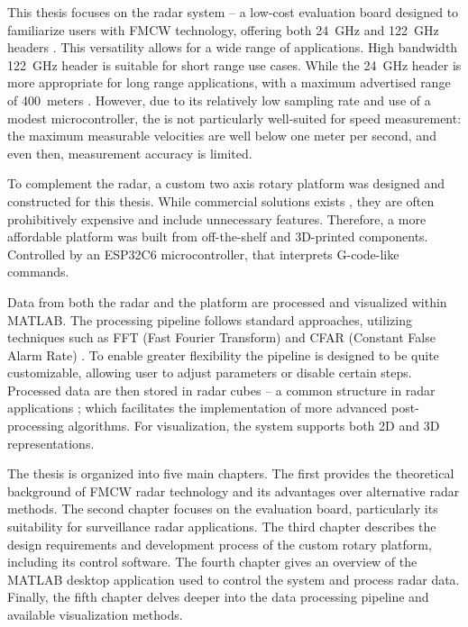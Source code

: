 This thesis focuses on the \sirad radar system -- a low-cost evaluation board designed to familiarize users with FMCW technology, offering both 24~GHz and 122~GHz headers \cite{siradMAN}.
This versatility allows for a wide range of applications.
High bandwidth 122~GHz header is suitable for short range use cases.
While the 24~GHz header is more appropriate for long range applications, with a maximum advertised range of 400~meters \cite{siradMANOld}.
However, due to its relatively low sampling rate and use of a modest microcontroller, the \sirad is not particularly well-suited for speed measurement: the maximum measurable velocities are well below one meter per second, and even then, measurement accuracy is limited.

To complement the radar, a custom two axis rotary platform was designed and constructed for this thesis.
While commercial solutions exists \cite{standa, carl}, they are often prohibitively expensive and include unnecessary features.
Therefore, a more affordable platform was built from off-the-shelf and 3D-printed components.
Controlled by an ESP32C6 microcontroller, that interprets G-code-like commands.

Data from both the radar and the platform are processed and visualized within MATLAB.
The processing pipeline follows standard approaches, utilizing techniques such as FFT (Fast Fourier Transform) and CFAR (Constant False Alarm Rate) \cite{richards2022}.
To enable greater flexibility the pipeline is designed to be quite customizable, allowing user to adjust parameters or disable certain steps.
Processed data are then stored in radar cubes -- a common structure in radar applications \cite{richards2022}; which facilitates the implementation of more advanced post-processing algorithms.
For visualization, the system supports both 2D and 3D representations.

The thesis is organized into five main chapters.
The first provides the theoretical background of FMCW radar technology and its advantages over alternative radar methods.
The second chapter focuses on the \sirad evaluation board, particularly its suitability for surveillance radar applications.
The third chapter describes the design requirements and development process of the custom rotary platform, including its control software.
The fourth chapter gives an overview of the MATLAB desktop application used to control the system and process radar data.
Finally, the fifth chapter delves deeper into the data processing pipeline and available visualization methods.
